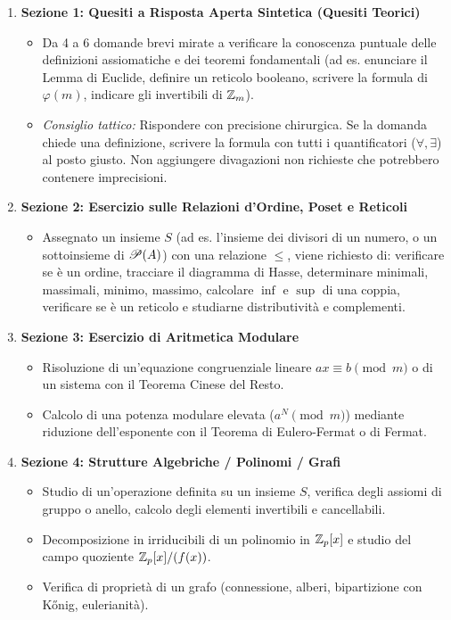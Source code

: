 \begin{enumerate}
    \item \textbf{Sezione 1: Quesiti a Risposta Aperta Sintetica (Quesiti Teorici)}
    \begin{itemize}
        \item Da 4 a 6 domande brevi mirate a verificare la conoscenza puntuale delle definizioni assiomatiche e dei teoremi fondamentali (ad es. enunciare il Lemma di Euclide, definire un reticolo booleano, scrivere la formula di $\varphi(m)$, indicare gli invertibili di $\Z_m$).
        \item \emph{Consiglio tattico:} Rispondere con precisione chirurgica. Se la domanda chiede una definizione, scrivere la formula con tutti i quantificatori ($\forall, \exists$) al posto giusto. Non aggiungere divagazioni non richieste che potrebbero contenere imprecisioni.
    \end{itemize}
    \item \textbf{Sezione 2: Esercizio sulle Relazioni d'Ordine, Poset e Reticoli}
    \begin{itemize}
        \item Assegnato un insieme $S$ (ad es. l'insieme dei divisori di un numero, o un sottoinsieme di $\P(A)$) con una relazione $\le$, viene richiesto di: verificare se è un ordine, tracciare il diagramma di Hasse, determinare minimali, massimali, minimo, massimo, calcolare $\inf$ e $\sup$ di una coppia, verificare se è un reticolo e studiarne distributività e complementi.
    \end{itemize}
    \item \textbf{Sezione 3: Esercizio di Aritmetica Modulare}
    \begin{itemize}
        \item Risoluzione di un'equazione congruenziale lineare $ax \equiv b \pmod m$ o di un sistema con il Teorema Cinese del Resto.
        \item Calcolo di una potenza modulare elevata ($a^N \pmod m$) mediante riduzione dell'esponente con il Teorema di Eulero-Fermat o di Fermat.
    \end{itemize}
    \item \textbf{Sezione 4: Strutture Algebriche / Polinomi / Grafi}
    \begin{itemize}
        \item Studio di un'operazione definita su un insieme $S$, verifica degli assiomi di gruppo o anello, calcolo degli elementi invertibili e cancellabili.
        \item Decomposizione in irriducibili di un polinomio in $\Z_p[x]$ e studio del campo quoziente $\Z_p[x]/(f(x))$.
        \item Verifica di proprietà di un grafo (connessione, alberi, bipartizione con Kőnig, eulerianità).
    \end{itemize}
\end{enumerate}

